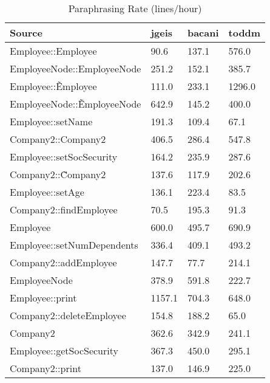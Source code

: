 \begin{table}[hb]
\begin{center}
\begin{tabular}{|l|l|l|l|}
\hline
Source & jgeis & bacani & toddm\\
\hline
Employee::Employee & 90.6 & 137.1 & 576.0\\
EmployeeNode::EmployeeNode & 251.2 & 152.1 & 385.7\\
Employee::\~Employee & 111.0 & 233.1 & 1296.0\\
EmployeeNode::\~EmployeeNode & 642.9 & 145.2 & 400.0\\
Employee::setName & 191.3 & 109.4 & 67.1\\
Company2::Company2 & 406.5 & 286.4 & 547.8\\
Employee::setSocSecurity & 164.2 & 235.9 & 287.6\\
Company2::\~Company2 & 137.6 & 117.9 & 202.6\\
Employee::setAge & 136.1 & 223.4 & 83.5\\
Company2::findEmployee & 70.5 & 195.3 & 91.3\\
Employee & 600.0 & 495.7 & 690.9\\
Employee::setNumDependents & 336.4 & 409.1 & 493.2\\
Company2::addEmployee & 147.7 & 77.7 & 214.1\\
EmployeeNode & 378.9 & 591.8 & 222.7\\
Employee::print & 1157.1 & 704.3 & 648.0\\
Company2::deleteEmployee & 154.8 & 188.2 & 65.0\\
Company2 & 362.6 & 342.9 & 241.1\\
Employee::getSocSecurity & 367.3 & 450.0 & 295.1\\
Company2::print & 137.0 & 146.9 & 225.0\\
\hline
\end{tabular}
\end{center}
\caption{Paraphrasing Rate (lines/hour)}
\end{table}
